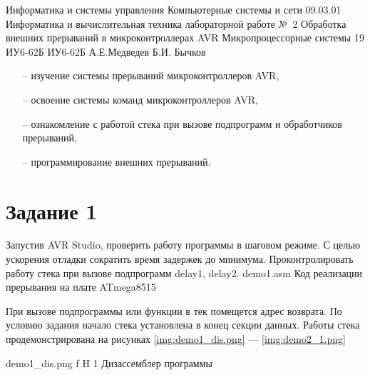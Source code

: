 \documentclass{bmstu}
\makeatletter
\renewcommand\chapter{\par%
\thispagestyle{plain}%
\@afterindentfalse \secdef\@chapter\@schapter}
\makeatother
\begin{document}
\makereporttitle
    {Информатика и системы управления} %
    {Компьютерные системы и сети} %
    {09.03.01 Информатика и вычислительная техника} %
    {лабораторной работе №~2} %
    {Обработка внешних прерываний в микроконтроллерах AVR} %
    {Микропроцессорные системы} %
    {19} %
    {ИУ6-62Б} %
    {
    	{ИУ6-62Б}
    	{А.Е.Медведев} %
    	{Б.И. Бычков} %
    } 
    
\chapter{Цель работы:}
\begin{itemize}
\item[--] изучение системы прерываний микроконтроллеров AVR,
\item[--] освоение системы команд микроконтроллеров AVR,
\item[--] ознакомление с работой стека при вызове подпрограмм и обработчиков прерываний,
\item[--] программирование внешних прерываний.  
\end{itemize}

\chapter{Задания:}
\section{Задание 1}
Запустив AVR Studio, проверить работу программы в шаговом режиме. С целью ускорения отладки сократить время задержек до минимума. Проконтролировать работу стека при вызове подпрограмм delay1, delay2.
	{demo1.asm}
	{Код реализации прерывания на плате ATmega8515}

При вызове подпрограммы или функции в тек помещется адрес возврата. По условию задания начало стека установлена в конец секции данных. Работы стека продемонстрирована на рисунках \ref{img:demo1_dis.png} --- \ref{img:demo2_1.png}

    {demo1_dis.png} %
    {f} %
    {H} %
    {1\textwidth} %
    {Дизассемблер программы} 
\end{document}
